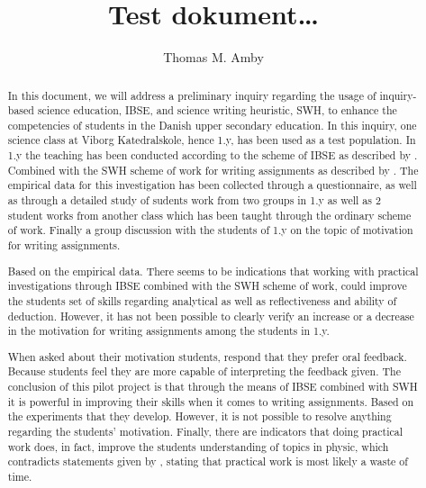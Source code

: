 \documentclass[a4paper,12pt,  twoside, openright,final]{memoir}
\title{Test dokument\ldots}
\author{Thomas M. Amby}
\begin{document}


\frontmatter
\begin{otherlanguage}{british}
	\begin{abstract}
		In this document, we will address a preliminary inquiry regarding the usage of inquiry-based science education, IBSE, and science writing heuristic, SWH, to enhance the competencies of students in the Danish upper secondary education. In this inquiry, one science class at Viborg Katedralskole, hence 1.y, has been used as a test population. In 1.y the teaching has been conducted according to the scheme of IBSE as described by \citet{Dolin2014}. Combined with the SWH scheme of work for writing assignments as described by \citet{Keys1999, Hand2004, Krogh2016}. The empirical data for this investigation has been collected through a questionnaire, as well as through a detailed study of sudents work from two groups in 1.y as well as 2 student works from another class which has been taught through the ordinary scheme of work.  Finally a group discussion with the students of 1.y on the topic of motivation for writing assignments.\bigskip

Based on the empirical data. There seems to be indications that working with practical investigations through IBSE combined with the SWH scheme of work, could improve the students set of skills regarding analytical as well as reflectiveness and ability of deduction. However, it has not been possible to clearly verify an increase or a decrease in the motivation for writing assignments among the students in 1.y. \bigskip

 When asked about their motivation students, respond that they prefer oral feedback. Because students feel they are more capable of interpreting the feedback given.
The conclusion of this pilot project is that through the means of IBSE combined with SWH it is powerful in improving their skills when it comes to writing assignments. Based on the experiments that they develop. However, it is not possible to resolve anything regarding the students' motivation. Finally, there are indicators that doing practical work does, in fact, improve the students understanding of topics in physic, which contradicts statements given by \citet{Hodson2008}, stating that practical work is most likely a waste of time. 
	\end{abstract}
\end{otherlanguage}
\end{document}

